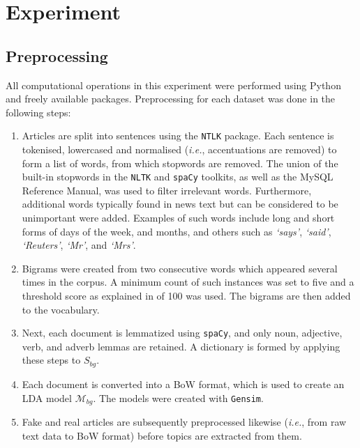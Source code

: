 \section{Experiment}
\label{sec:4-experiment}

\subsection{Preprocessing}
\label{ssec:4-preprocessing}

All computational operations in this experiment were performed using Python and freely available packages. Preprocessing for each dataset was done in the following steps:

\begin{enumerate}
  \item Articles are split into sentences using the \texttt{NTLK} package. Each sentence is tokenised, lowercased and normalised (\emph{i.e.}, accentuations are removed) to form a list of words, from which stopwords are removed. The union of the built-in stopwords in the \texttt{NLTK}  and \texttt{spaCy} toolkits, as well as the MySQL Reference Manual, was used to filter irrelevant words. Furthermore, additional words typically found in news text but can be considered to be unimportant were added. Examples of such words include long and short forms of days of the week, and months, and others such as \emph{`says'}, \emph{`said'}, \emph{`Reuters'}, \emph{`Mr'}, and \emph{`Mrs'}.

  \item Bigrams were created from two consecutive words which appeared several times in the corpus. A minimum count of such instances was set to five and a threshold score as explained in  of 100 was used. The bigrams are then added to the vocabulary.

  \item Next, each document is lemmatized using \texttt{spaCy}, and only noun, adjective, verb, and adverb lemmas are retained. A dictionary is formed by applying these steps to $S_{bg}$.

  \item Each document is converted into a \ac{BoW} format, which is used to create an \ac{LDA} model $\mathscr{M}_{bg}$. The models were created with \texttt{Gensim}.

  \item Fake and real articles are subsequently preprocessed likewise (\emph{i.e.}, from raw text data to \ac{BoW} format) before topics are extracted from them.
\end{enumerate}

